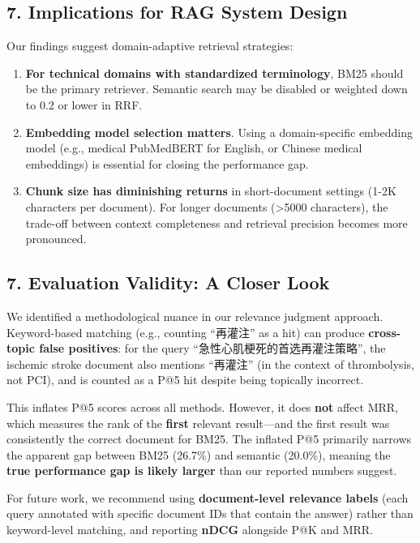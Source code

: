 \documentclass[
]{article}
\begin{document}
\subsection{7. Implications for RAG System
Design}\label{implications-for-rag-system-design}

Our findings suggest domain-adaptive retrieval strategies:

\begin{enumerate}
\def\labelenumi{\arabic{enumi}.}
\item
  \textbf{For technical domains with standardized terminology}, BM25
  should be the primary retriever. Semantic search may be disabled or
  weighted down to 0.2 or lower in RRF.
\item
  \textbf{Embedding model selection matters}. Using a domain-specific
  embedding model (e.g., medical PubMedBERT for English, or Chinese
  medical embeddings) is essential for closing the performance gap.
\item
  \textbf{Chunk size has diminishing returns} in short-document settings
  (1-2K characters per document). For longer documents (\textgreater5000
  characters), the trade-off between context completeness and retrieval
  precision becomes more pronounced.
\end{enumerate}

\subsection{7. Evaluation Validity: A Closer
Look}\label{evaluation-validity-a-closer-look}

We identified a methodological nuance in our relevance judgment
approach. Keyword-based matching (e.g., counting ``再灌注'' as a hit)
can produce \textbf{cross-topic false positives}: for the query
``急性心肌梗死的首选再灌注策略'', the ischemic stroke document also
mentions ``再灌注'' (in the context of thrombolysis, not PCI), and is
counted as a P@5 hit despite being topically incorrect.

This inflates P@5 scores across all methods. However, it does
\textbf{not} affect MRR, which measures the rank of the \textbf{first}
relevant result---and the first result was consistently the correct
document for BM25. The inflated P@5 primarily narrows the apparent gap
between BM25 (26.7\%) and semantic (20.0\%), meaning the \textbf{true
performance gap is likely larger} than our reported numbers suggest.

For future work, we recommend using \textbf{document-level relevance
labels} (each query annotated with specific document IDs that contain
the answer) rather than keyword-level matching, and reporting
\textbf{nDCG} alongside P@K and MRR.
\end{document}
